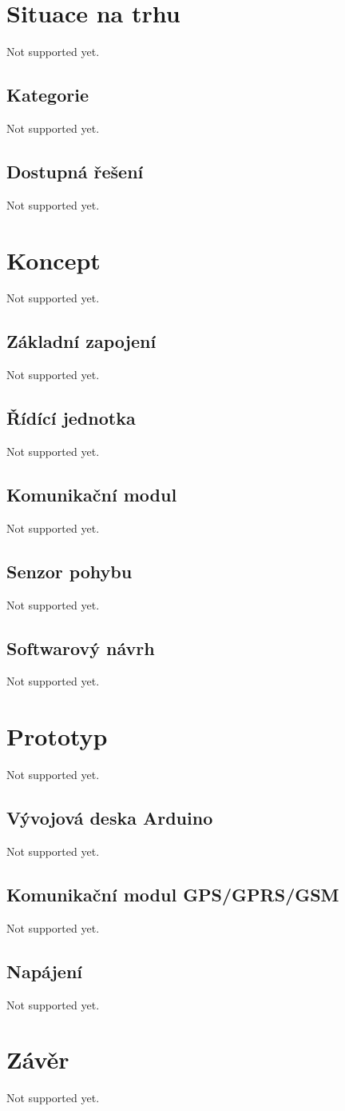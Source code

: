 \documentclass[FM,BP]{tulthesis}
\begin{document}
\chapter{Situace na trhu}
Not supported yet.

\section{Kategorie}
Not supported yet.

\section{Dostupná řešení}
Not supported yet.

\chapter{Koncept}
Not supported yet.

\section{Základní zapojení}
Not supported yet.

\section{Řídící jednotka}
Not supported yet.

\section{Komunikační modul}
Not supported yet.

\section{Senzor pohybu}
Not supported yet.

\section{Softwarový návrh}
Not supported yet.

\chapter{Prototyp}
Not supported yet.

\section{Vývojová deska Arduino}
Not supported yet.

\section{Komunikační modul GPS/GPRS/GSM}
Not supported yet.

\section{Napájení}
Not supported yet.

\chapter{Závěr}
Not supported yet.
\end{document}
